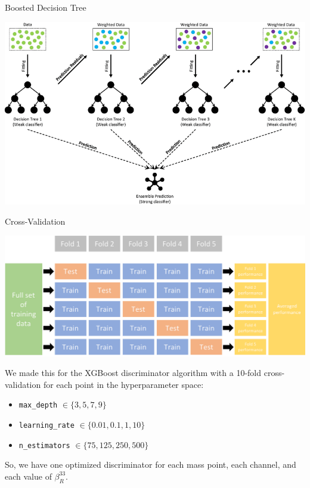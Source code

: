\documentclass{bredelebeamer}
\begin{document}
\begin{frame}{Boosted Decision Tree}
	\begin{center}
		\includegraphics[width=1.0\linewidth]{BDT.png}
	\end{center}
\end{frame}


\begin{frame}{Cross-Validation}
	\begin{center}
		\includegraphics[width=1.0\linewidth]{CV.png}
	\end{center}

	We made this for the XGBoost discriminator algorithm with a 10-fold cross-validation for each point in the hyperparameter space:
	\begin{itemize}
		\item \texttt{max\_depth} $\in \{3, 5, 7, 9\}$
		\item \texttt{learning\_rate} $\in \{ 0.01, 0.1, 1, 10\}$
		\item \texttt{n\_estimators} $\in \{75, 125, 250, 500\}$
	\end{itemize}
	So, we have one optimized discriminator for each mass point, each channel, and each value of $\beta_R^{33}$.

\end{frame}
\end{document}
